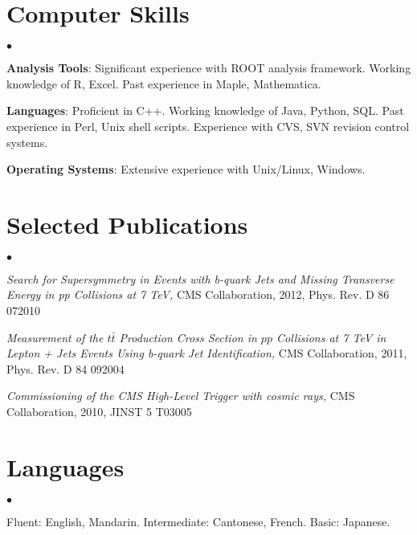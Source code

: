 \documentclass[margin,line]{res}
\newenvironment{list2}{
  \begin{list}{$\bullet$}{%
      \setlength{\itemsep}{0in}
      \setlength{\parsep}{0in} \setlength{\parskip}{0in}
      \setlength{\topsep}{0in} \setlength{\partopsep}{0in} 
      \setlength{\leftmargin}{0.2in}}}{\end{list}}
\begin{document}
\begin{resume}
\section{\sc Computer Skills} 
\begin{list2}
\item{\bf Analysis Tools}: Significant experience with ROOT analysis
  framework. Working knowledge of R, Excel.  Past experience in Maple,
  Mathematica.
\item {\bf Languages}: Proficient in C++.  Working knowledge of Java,
  Python, SQL.  Past experience in Perl, Unix shell scripts.
  Experience with CVS, SVN revision control systems.
\item {\bf Operating Systems}:  Extensive experience with Unix/Linux, Windows. 
\end{list2}



\section{\sc Selected Publications}
\begin{list2}
\item \textit{Search for Supersymmetry in Events with b-quark Jets and Missing Transverse Energy in pp Collisions at 7 TeV,} CMS Collaboration, 2012, Phys. Rev. D 86 072010
\item \textit{Measurement of the $t\bar{t}$ Production Cross Section
  in $pp$ Collisions at 7 TeV in Lepton + Jets Events Using b-quark
  Jet Identification,} CMS Collaboration, 2011, Phys. Rev. D 84 092004
\item \textit{Commissioning of the CMS High-Level Trigger with cosmic rays,} CMS Collaboration, 2010, JINST 5 T03005
\end{list2}


\section{\sc Languages}
\begin{list2}
\item Fluent: English, Mandarin. Intermediate: Cantonese, French.  Basic: Japanese.
\end{list2}



\end{resume}
\end{document}
